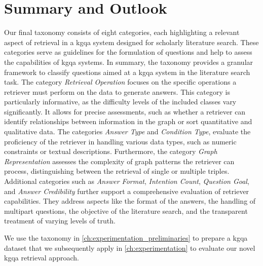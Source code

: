 
\section{Summary and Outlook}

Our final taxonomy consists of eight categories, each highlighting a relevant aspect of retrieval in a \gls{kgqa} system designed for scholarly literature search. These categories serve as guidelines for the formulation of questions and help to assess the capabilities of \gls{kgqa} systems. In summary, the taxonomy provides a granular framework to classify questions aimed at a \gls{kgqa} system in the literature search task. The category \emph{Retrieval Operation} focuses on the specific operations a retriever must perform on the data to generate answers. This category is particularly informative, as the difficulty levels of the included classes vary significantly. It allows for precise assessments, such as whether a retriever can identify relationships between information in the graph or sort quantitative and qualitative data. The categories \emph{Answer Type} and \emph{Condition Type}, evaluate the proficiency of the retriever in handling various data types, such as numeric constraints or textual descriptions. Furthermore, the category \emph{Graph Representation} assesses the complexity of graph patterns the retriever can process, distinguishing between the retrieval of single or multiple triples. Additional categories such as \emph{Answer Format}, \emph{Intention Count}, \emph{Question Goal}, and \emph{Answer Credibility} further support a comprehensive evaluation of retriever capabilities. They address aspects like the format of the answers, the handling of multipart questions, the objective of the literature search, and the transparent treatment of varying levels of truth.

We use the taxonomy in \autoref{ch:experimentation_preliminaries} to prepare a \gls{kgqa} dataset that we subsequently apply in \autoref{ch:experimentation} to evaluate our novel \gls{kgqa} retrieval approach.